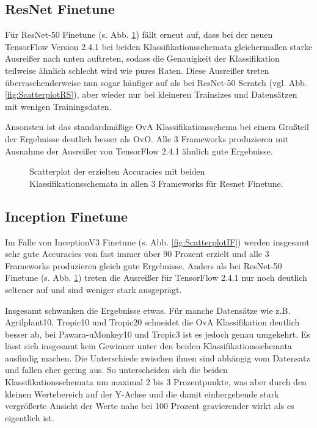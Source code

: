 \subsection{ResNet Finetune}
Für ResNet-50 Finetune (s. Abb. \ref{fig:ScatterplotRF}) fällt erneut auf, dass bei der neuen TensorFlow \cite{tensorflow} Version 2.4.1 bei beiden Klassifikationsschemata gleichermaßen starke Ausreißer nach unten auftreten, sodass die Genauigkeit der Klassifikation teilweise ähnlich schlecht wird wie pures Raten. Diese Ausreißer treten überraschenderweise nun sogar häufiger auf als bei ResNet-50 Scratch (vgl. Abb. \ref{fig:ScatterplotRS}), aber wieder nur bei kleineren Trainsizes und Datensätzen mit wenigen Trainingsdaten.

Ansonsten ist das standardmäßige OvA Klassifikationsschema bei einem Großteil der Ergebnisse deutlich besser als OvO. Alle 3 Frameworks produzieren mit Ausnahme der Ausreißer von TensorFlow \cite{tensorflow} 2.4.1 ähnlich gute Ergebnisse.
\begin{figure}[H]
\begin{adjustbox}{width=\textwidth, center}

\end{adjustbox}
\caption{Scatterplot der erzielten Accuracies mit beiden Klassifikationsschemata in allen 3 Frameworks für Resnet Finetune.}
\label{fig:ScatterplotRF}
\end{figure}
\subsection{Inception Finetune}
Im Falle von InceptionV3 Finetune (s. Abb. \ref{fig:ScatterplotIF}) werden insgesamt sehr gute Accuracies von fast immer über 90 Prozent erzielt und alle 3 Frameworks produzieren gleich gute Ergebnisse. Anders als bei ResNet-50 Finetune (s. Abb. \ref{fig:ScatterplotRF}) treten die Ausreißer für TensorFlow \cite{tensorflow} 2.4.1 nur noch deutlich seltener auf und sind weniger stark ausgeprägt.

Insgesamt schwanken die Ergebnisse etwas. Für manche Datensätze wie z.B. Agrilplant10, Tropic10 und Tropic20 schneidet die OvA Klassifikation deutlich besser ab, bei Pawara-uMonkey10 und Tropic3 ist es jedoch genau umgekehrt.
Es lässt sich insgesamt kein Gewinner unter den beiden Klassifikationsschemata ausfindig machen. Die Unterschiede zwischen ihnen sind abhängig vom Datensatz und fallen eher gering aus. So unterscheiden sich die beiden Klassifikationsschemata um maximal 2 bis 3 Prozentpunkte, was aber durch den kleinen Wertebereich auf der Y-Achse und die damit einhergehende stark vergrößerte Ansicht der Werte nahe bei 100 Prozent gravierender wirkt als es eigentlich ist.


